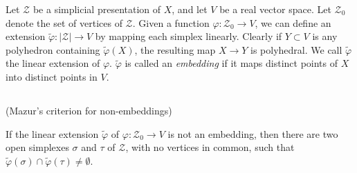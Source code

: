 Let $\mathscr{Z}$ be a simplicial presentation of $X$, and let $V$ be a real vector space. Let $\mathscr{Z}_{0}$ denote the set of vertices of $\mathscr{Z}$. Given a function $\varphi:\mathscr{Z}_{0}\to V$, we can define an extension $\widetilde{\varphi}:|\mathscr{Z}|\to V$ by mapping each simplex linearly. Clearly if $Y\subset V$ is any polyhedron containing $\widetilde{\varphi}(X)$, the resulting map $X\to Y$ is polyhedral. We call $\widetilde{\varphi}$ the linear extension of $\varphi$. 
$\widetilde{\varphi}$ is called an {\em embedding} if it maps distinct points of $X$ into distinct points in $V$.

\subsection{}\label{chap3-sec3.3.1}
(Mazur's criterion for non-embeddings)

If the linear extension $\widetilde{\varphi}$ of $\varphi:\mathscr{Z}_{0}\to V$ is not an embedding, then there are two open simplexes $\sigma$ and $\tau$ of $\mathscr{Z}$, with no vertices in common, such that $\widetilde{\varphi}(\sigma)\cap \widetilde{\varphi}(\tau)\neq \emptyset$. 

